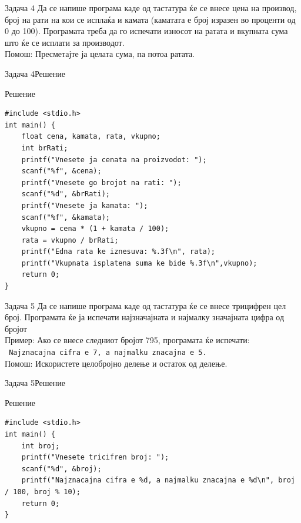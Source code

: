 \begin{frame}[fragile]{Задача 4}
Да се напише програма каде од тастатура ќе се внесе цена на производ, број на рати на кои се исплаќа и 
камата (каматата е број изразен во проценти од 0 до 100). 
Програмата треба да го испечати износот на ратата и вкупната сума што ќе се исплати за производот.\\
Помош: Пресметајте ја целата сума, па потоа ратата.
\end{frame}

\begin{frame}[fragile]{Задача 4}{Решение}
    \begin{exampleblock}{Решение}
\begin{lstlisting}
#include <stdio.h>
int main() {
    float cena, kamata, rata, vkupno;
    int brRati;
    printf("Vnesete ja cenata na proizvodot: ");
    scanf("%f", &cena);
    printf("Vnesete go brojot na rati: ");
    scanf("%d", &brRati);
    printf("Vnesete ja kamata: ");
    scanf("%f", &kamata);
    vkupno = cena * (1 + kamata / 100);
    rata = vkupno / brRati;
    printf("Edna rata ke iznesuva: %.3f\n", rata);
    printf("Vkupnata isplatena suma ke bide %.3f\n",vkupno);
    return 0;
}
\end{lstlisting}
    \end{exampleblock}
\end{frame}

\begin{frame}[fragile]{Задача 5}
Да се напише програма каде од тастатура ќе се внесе трицифрен цел број. Програмата ќе ја испечати најзначајната и најмалку значајната цифра од бројот\\
Пример: Ако се внесе следниот бројот 795, програмата ќе испечати:\\
\texttt{    Najznacajna cifra e 7, a najmalku znacajna e 5.}\\
Помош: Искористете целобројно делење и остаток од делење.
\end{frame}

\begin{frame}[fragile]{Задача 5}{Решение}
    \begin{exampleblock}{Решение}
        \begin{lstlisting}
#include <stdio.h>
int main() {
    int broj;
    printf("Vnesete tricifren broj: ");
    scanf("%d", &broj);
    printf("Najznacajna cifra e %d, a najmalku znacajna e %d\n", broj / 100, broj % 10);
    return 0;
}
        \end{lstlisting}
    \end{exampleblock}
\end{frame}

